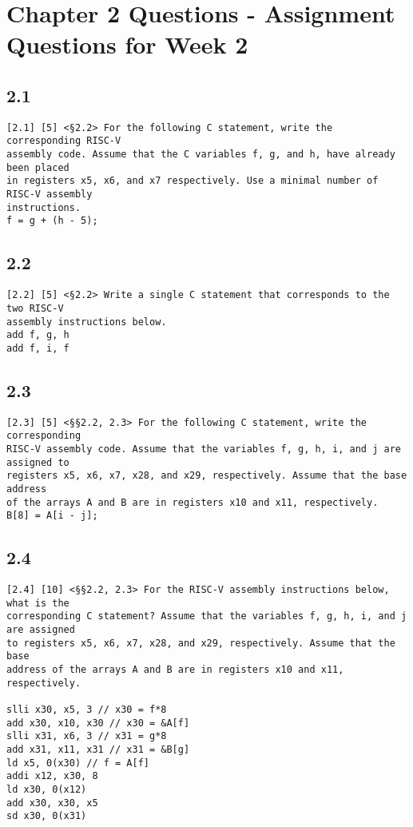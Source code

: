 \documentclass[11pt]{article}
\begin{document}
\section*{Chapter 2 Questions - Assignment Questions for Week 2}

\subsection*{2.1}
\begin{verbatim}
[2.1] [5] <§2.2> For the following C statement, write the corresponding RISC-V 
assembly code. Assume that the C variables f, g, and h, have already been placed 
in registers x5, x6, and x7 respectively. Use a minimal number of RISC-V assembly 
instructions.
f = g + (h - 5);
\end{verbatim}

\subsection*{2.2}
\begin{verbatim}
[2.2] [5] <§2.2> Write a single C statement that corresponds to the two RISC-V 
assembly instructions below.
add f, g, h
add f, i, f
\end{verbatim}

\subsection*{2.3}
\begin{verbatim}
[2.3] [5] <§§2.2, 2.3> For the following C statement, write the corresponding 
RISC-V assembly code. Assume that the variables f, g, h, i, and j are assigned to 
registers x5, x6, x7, x28, and x29, respectively. Assume that the base address 
of the arrays A and B are in registers x10 and x11, respectively.
B[8] = A[i - j];
\end{verbatim}

\subsection*{2.4}
\begin{verbatim}
[2.4] [10] <§§2.2, 2.3> For the RISC-V assembly instructions below, what is the 
corresponding C statement? Assume that the variables f, g, h, i, and j are assigned 
to registers x5, x6, x7, x28, and x29, respectively. Assume that the base 
address of the arrays A and B are in registers x10 and x11, respectively.

slli x30, x5, 3 // x30 = f*8
add x30, x10, x30 // x30 = &A[f]
slli x31, x6, 3 // x31 = g*8
add x31, x11, x31 // x31 = &B[g]
ld x5, 0(x30) // f = A[f]
addi x12, x30, 8
ld x30, 0(x12)
add x30, x30, x5
sd x30, 0(x31)
\end{verbatim}
\end{document}
